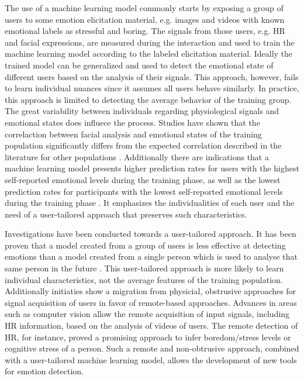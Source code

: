 The use of a machine learning model commonly starts by exposing a group of users to some emotion elicitation material, e.g. images and videos with known emotional labels as stressful and boring. The signals from those users, e.g. HR and facial expressions, are measured during the interaction and used to train the machine learning model according to the labeled elicitation material. Ideally the trained model can be generalized and used to detect the emotional state of different users based on the analysis of their signals. This approach, however, fails to learn individual nuances since it assumes all users behave similarly. In practice, this approach is limited to detecting the average behavior of the training group. The great variability between individuals regarding physiological signals and emotional states does influece the process. Studies have shown that the correlaction between facial analysis and emotional states of the training population significantly differs from the expected correlation described in the literature for other populations \parencite{grafsgaard2013automatically}. Additionally there are indications that a machine learning model presents higher prediction rates for users with the highest self-reported emotional levels during the training phase, as well as the lowest prediction rates for participants with the lowest self-reported emotional levels during the training phase \parencite{mcduffcogcam}. It emphasizes the individualities of each user and the need of a user-tailored approach that preserves such characteristics.

Investigations have been conducted towards a user-tailored approach. It has been proven that a model created from a group of users is less effective at detecting emotions than a model created from a single person which is used to analyse that same person in the future \parencite{bailenson2008real}. This user-tailored approach is more likely to learn individual characteristics, not the average features of the training population. Additionally initiaties show a migration from physicial, obstrusive approaches for signal acquisition of users in favor of remote-based approaches. Advances in areas such as computer vision allow the remote acquisition of input signals, including HR information, based on the analysis of videos of users. The remote detection of HR, for instance, proved a promising approach to infer boredom/stress levels \parencite{kukolja2014comparative} or cognitive stress \parencite{mcduff2014remote} of a person. Such a remote and non-obtrusive approach, combined with a user-tailored machine learning model, allows the development of new tools for emotion detection.

